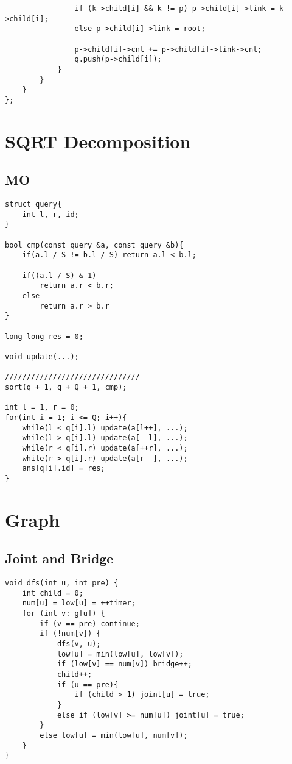 \documentclass[11pt,a4paper]{article}
\begin{document}
\begin{multicols*}{2}
\begin{lstlisting}
				if (k->child[i] && k != p) p->child[i]->link = k->child[i];
				else p->child[i]->link = root;
				
				p->child[i]->cnt += p->child[i]->link->cnt;
				q.push(p->child[i]);
			}
		}
	}
};
\end{lstlisting}

\section{SQRT Decomposition}
\subsection{MO}
\begin{lstlisting}
struct query{
	int l, r, id;
}

bool cmp(const query &a, const query &b){
    if(a.l / S != b.l / S) return a.l < b.l;  

    if((a.l / S) & 1)
        return a.r < b.r;
    else
        return a.r > b.r
}

long long res = 0;

void update(...);

///////////////////////////////
sort(q + 1, q + Q + 1, cmp);

int l = 1, r = 0;
for(int i = 1; i <= Q; i++){
    while(l < q[i].l) update(a[l++], ...);
    while(l > q[i].l) update(a[--l], ...);
    while(r < q[i].r) update(a[++r], ...);
    while(r > q[i].r) update(a[r--], ...);
    ans[q[i].id] = res;
}
\end{lstlisting}

\section{Graph}
\subsection{Joint and Bridge}
\begin{lstlisting}
void dfs(int u, int pre) {
    int child = 0; 
    num[u] = low[u] = ++timer;
    for (int v: g[u]) {
        if (v == pre) continue;
        if (!num[v]) {
            dfs(v, u);
            low[u] = min(low[u], low[v]);
            if (low[v] == num[v]) bridge++;
            child++;
            if (u == pre){
                if (child > 1) joint[u] = true;
            }
            else if (low[v] >= num[u]) joint[u] = true;
        }
        else low[u] = min(low[u], num[v]);
    }
}
\end{lstlisting}


\end{multicols*}
\end{document}
